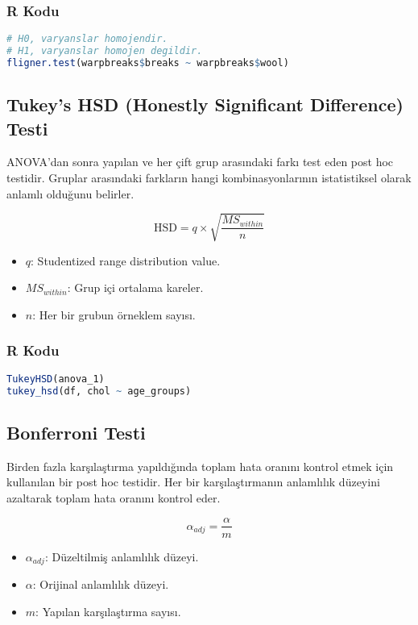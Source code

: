 \subsubsection{R Kodu}

\begin{lstlisting}[language=R]
# H0, varyanslar homojendir.
# H1, varyanslar homojen degildir.
fligner.test(warpbreaks$breaks ~ warpbreaks$wool)
\end{lstlisting}

\newpage

\subsection{Tukey's HSD (Honestly Significant Difference) Testi}
ANOVA'dan sonra yapılan ve her çift grup arasındaki farkı test eden post hoc testidir. Gruplar arasındaki farkların hangi kombinasyonlarının istatistiksel olarak anlamlı olduğunu belirler.

\[  \text{HSD} = q \times \sqrt{\frac{MS_{within}}{n}} \]

\begin{itemize}
	\item $q$: Studentized range distribution value.
	\item $MS_{within}$: Grup içi ortalama kareler.
	\item $n$: Her bir grubun örneklem sayısı.
\end{itemize}

\subsubsection{R Kodu}

\begin{lstlisting}[language=R]
TukeyHSD(anova_1)
tukey_hsd(df, chol ~ age_groups)
\end{lstlisting}

\newpage

\subsection{Bonferroni Testi}
Birden fazla karşılaştırma yapıldığında toplam hata oranını kontrol etmek için kullanılan bir post hoc testidir. Her bir karşılaştırmanın anlamlılık düzeyini azaltarak toplam hata oranını kontrol eder.

\[ \alpha_{adj} = \frac{\alpha}{m} \]

\begin{itemize}
	\item $\alpha_{adj}$: Düzeltilmiş anlamlılık düzeyi.
	\item $\alpha$: Orijinal anlamlılık düzeyi.
	\item $m$: Yapılan karşılaştırma sayısı.
\end{itemize}


